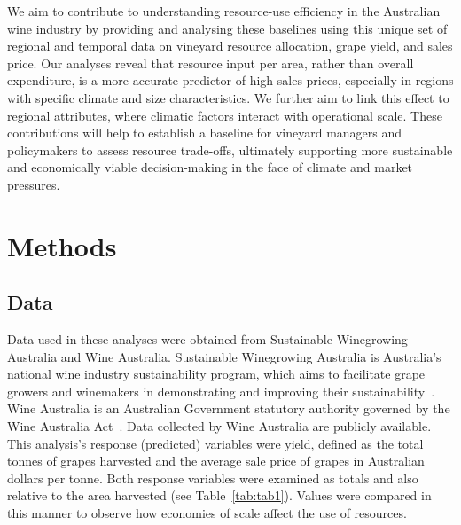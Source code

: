 \documentclass[10pt,letterpaper]{article}
\begin{document}
\par
We aim to contribute to understanding resource-use efficiency in the Australian wine industry by providing and analysing these baselines using this unique set of regional and temporal data on vineyard resource allocation, grape yield, and sales price. Our analyses reveal that resource input per area, rather than overall expenditure, is a more accurate predictor of high sales prices, especially in regions with specific climate and size characteristics. We further aim to link this effect to regional attributes, where climatic factors interact with operational scale. These contributions will help to establish a baseline for vineyard managers and policymakers to assess resource trade-offs, ultimately supporting more sustainable and economically viable decision-making in the face of climate and market pressures.

\section*{Methods}
\subsection*{Data}


Data used in these analyses were obtained from Sustainable Winegrowing Australia and Wine Australia. Sustainable Winegrowing Australia is Australia's national wine industry sustainability program, which aims to facilitate grape growers and winemakers in demonstrating and improving their sustainability~\cite{swaSustainableWingrowingAustralia2022}. Wine Australia is an Australian Government statutory authority governed by the Wine Australia Act~\cite{attorney-generalsdepartmentWineAustraliaCorporation2010}. Data collected by Wine Australia are publicly available. This analysis's response (predicted) variables were yield, defined as the total tonnes of grapes harvested and the average sale price of grapes in Australian dollars per tonne. Both response variables were examined as totals and also relative to the area harvested (see Table~\ref{tab:tab1}). Values were compared in this manner to observe how economies of scale affect the use of resources.
\end{document}
